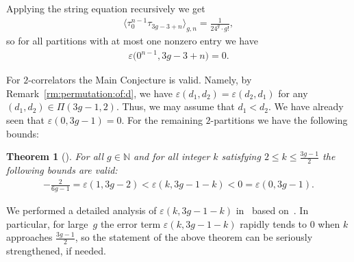 \documentclass[pdftex]{sigma}
\renewcommand{\epsilon}{\varepsilon}
\newcommand\N{\mathbb N}
\newtheorem*{NNTheorem}{Theorem}
\theoremstyle{definition}
\begin{document}
Applying the string equation recursively we get
\begin{gather}
\label{eq:almost:zero:partition}
\big\langle\tau_0^{n-1}\tau_{3g-3+n}\big\rangle_{g,n}=\frac{1}{24^g\cdot g!} ,
\end{gather}
so for all partitions with at most one nonzero entry we have
\begin{gather}\label{eq:epsilon:0:1corr}
\epsilon\big(0^{n-1},3g-3+n\big)=0 .
\end{gather}

For $2$-correlators the Main Conjecture is valid. Namely, by Remark~\ref{rm:permutation:of:d}, we have $\epsilon(d_1,d_2)= \epsilon(d_2,d_1)$ for any $(d_1,d_2)\in\Pi(3g-1,2)$. Thus, we may assume that $d_1<d_2$. We have already seen that $\epsilon(0,3g-1)=0$. For the remaining $2$-partitions we have the following bounds:

\begin{NNTheorem}[\cite{DGZZ:volume}]
For all $g\in\N$ and for all integer $k$ satisfying
$2\le k\le \frac{3g-1}{2}$ the following bounds are valid:
\begin{gather}\label{eq:main:bounds}
- \frac{2}{6g-1}=\epsilon(1,3g-2)< \epsilon(k,3g-1-k)< 0=\epsilon(0,3g-1) .
\end{gather}
\end{NNTheorem}

We performed a detailed analysis of $\epsilon(k,3g-1-k)$ in~\cite{DGZZ:volume}
based on~\cite{Zograf:2:correlators}. In particular, for large~$g$ the error term $\epsilon(k,3g-1-k)$ rapidly tends to $0$ when $k$ approaches $\frac{3g-1}{2}$, so the statement of the above theorem can be seriously strengthened, if needed.
\end{document}
